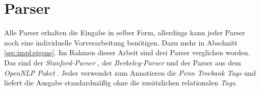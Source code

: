 \section{Parser}

Alle Parser erhalten die Eingabe in selber Form, allerdings kann jeder Parser noch eine individuelle Vorverarbeitung benötigen. Dazu mehr in Abschnitt \ref{sec:impl:eigene}.
Im Rahmen dieser Arbeit sind drei Parser verglichen worden. Das sind der \textit{Stanford-Parser} \cite{stanfordparser}, der \textit{Berkeley-Parser} \cite{berkeleyparser1} und der Parser aus dem \textit{OpenNLP Paket} \cite{openNlpManual}. Jeder verwendet zum Annotieren die \textit{Penn Treebank Tags} und liefert die Ausgabe standardmäßig ohne die zusätzlichen relationalen \textit{Tags}. 

